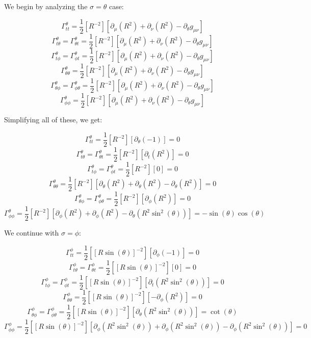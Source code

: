 \begin{enumerate}
\begin{enumerate}
          We begin by analyzing the $\sigma=\theta$ case:

          $$\Gamma^{\theta}_{tt}=\frac{1}{2}\left[ R^{-2} \right]\left[ \partial_{\mu}(R^2)+\partial_{\nu}(R^2)-\partial_{\theta}g_{\mu\nu}  \right]$$
          $$\Gamma^{\theta}_{t\theta}=\Gamma^{\theta}_{\theta t}=\frac{1}{2}\left[ R^{-2} \right]\left[ \partial_{\mu}(R^2)+\partial_{\nu}(R^2)-\partial_{\theta}g_{\mu\nu}  \right]$$
          $$\Gamma^{\theta}_{t\phi}=\Gamma^{\theta}_{\phi t}=\frac{1}{2}\left[ R^{-2} \right]\left[ \partial_{\mu}(R^2)+\partial_{\nu}(R^2)-\partial_{\theta}g_{\mu\nu}  \right]$$
          $$\Gamma^{\theta}_{\theta\theta}=\frac{1}{2}\left[ R^{-2} \right]\left[ \partial_{\mu}(R^2)+\partial_{\nu}(R^2)-\partial_{\theta}g_{\mu\nu}  \right]$$
          $$\Gamma^{\theta}_{\theta\phi}=\Gamma^{\theta}_{\phi\theta}=\frac{1}{2}\left[ R^{-2} \right]\left[ \partial_{\mu}(R^2)+\partial_{\nu}(R^2)-\partial_{\theta}g_{\mu\nu}  \right]$$
          $$\Gamma^{\theta}_{\phi\phi}=\frac{1}{2}\left[ R^{-2} \right]\left[ \partial_{\mu}(R^2)+\partial_{\nu}(R^2)-\partial_{\theta}g_{\mu\nu}  \right]$$

          Simplifying all of these, we get:

          $$\Gamma^{\theta}_{tt}=\frac{1}{2}\left[ R^{-2} \right]\left[ \partial_{\theta}(-1)\right]=0$$
          $$\Gamma^{\theta}_{t\theta}=\Gamma^{\theta}_{\theta t}=\frac{1}{2}\left[ R^{-2} \right]\left[ \partial_{t}(R^2)\right]=0$$
          $$\Gamma^{\theta}_{t\phi}=\Gamma^{\theta}_{\phi t}=\frac{1}{2}\left[ R^{-2} \right]\left[ 0\right]=0$$
          $$\Gamma^{\theta}_{\theta\theta}=\frac{1}{2}\left[ R^{-2} \right]\left[ \partial_{\theta}(R^2)+\partial_{\theta}(R^2)-\partial_{\theta}(R^2)  \right]=0$$
          $$\Gamma^{\theta}_{\theta\phi}=\Gamma^{\theta}_{\phi\theta}=\frac{1}{2}\left[ R^{-2} \right]\left[ \partial_{\phi}(R^2)\right]=0$$
          $$\Gamma^{\theta}_{\phi\phi}=\frac{1}{2}\left[ R^{-2} \right]\left[ \partial_{\phi}(R^2)+\partial_{\phi}(R^2)-\partial_{\theta}(R^2\sin^2(\theta))  \right]=-\sin(\theta)\cos(\theta)$$

          We continue with $\sigma=\phi$:

          $$\Gamma^{\phi}_{tt}=\frac{1}{2}\left[ [R\sin(\theta)]^{-2} \right]\left[ \partial_{\phi}(-1)\right]=0$$
          $$\Gamma^{\phi}_{t\theta}=\Gamma^{\phi}_{\theta t}=\frac{1}{2}\left[ [R\sin(\theta)]^{-2} \right]\left[ 0 \right]=0$$
          $$\Gamma^{\phi}_{t\phi}=\Gamma^{\phi}_{\phi t}=\frac{1}{2}\left[ [R\sin(\theta)]^{-2} \right]\left[ \partial_{t}(R^2\sin^2(\theta))\right]=0$$
          $$\Gamma^{\phi}_{\theta\theta}=\frac{1}{2}\left[ [R\sin(\theta)]^{-2} \right]\left[ -\partial_{\phi}(R^2)  \right]=0$$
          $$\Gamma^{\phi}_{\theta\phi}=\Gamma^{\phi}_{\phi\theta}=\frac{1}{2}\left[ [R\sin(\theta)]^{-2} \right]\left[ \partial_{\theta}(R^2\sin^2(\theta))\right]=\cot(\theta)$$
          $$\Gamma^{\phi}_{\phi\phi}=\frac{1}{2}\left[ [R\sin(\theta)]^{-2} \right]\left[ \partial_{\phi}(R^2\sin^2(\theta))+\partial_{\phi}(R^2\sin^2(\theta))-\partial_{\phi}(R^2\sin^2(\theta))  \right]=0$$


\end{enumerate}
\end{enumerate}
